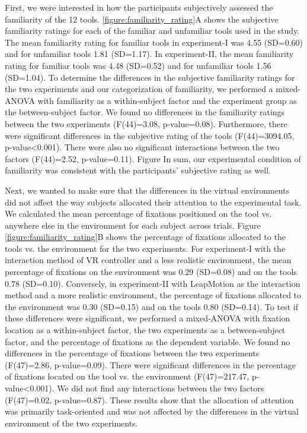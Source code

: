 First, we were interested in how the participants subjectively assessed the familiarity of the 12 tools. \ref{figure:familiarity_rating}A shows the subjective familiarity ratings for each of the familiar and unfamiliar tools used in the study. The mean familiarity rating for familiar tools in experiment-I was 4.55 (SD=0.60) and for unfamiliar tools 1.81 (SD=1.17). In experiment-II, the mean familiarity rating for familiar tools was 4.48 (SD=0.52) and for unfamiliar tools 1.56 (SD=1.04). To determine the differences in the subjective familiarity ratings for the two experiments and our categorization of familiarity, we performed a mixed-ANOVA with familiarity as a within-subject factor and the experiment group as the between-subject factor. We found no differences in the familiarity ratings between the two experiments (F(44)=3.08, p-value=0.08). Furthermore, there were significant differences in the subjective rating of the tools (F(44)=3094.05, p-value<0.001). There were also no significant interactions between the two factors (F(44)=2.52, p-value=0.11). Figure  In sum, our experimental condition of familiarity was consistent with the participants’ subjective rating as well. 

Next, we wanted to make sure that the differences in the virtual environments did not affect the way subjects allocated their attention to the experimental task. We calculated the mean percentage of fixations positioned on the tool vs. anywhere else in the environment for each subject across trials. Figure \ref{figure:familiarity_rating}B shows the percentage of fixations allocated to the tools vs. the environment for the two experiments. For experiment-I with the interaction method of VR controller and a less realistic environment, the mean percentage of fixations on the environment was 0.29 (SD=0.08) and on the tools 0.78 (SD=0.10). Conversely, in experiment-II with LeapMotion as the interaction method and a more realistic environment, the percentage of fixations allocated to the environment was 0.30 (SD=0.15) and on the tools 0.80 (SD=0.14). To test if these differences were significant, we performed a mixed-ANOVA with fixation location as a within-subject factor, the two experiments as a between-subject factor, and the percentage of fixations as the dependent variable.  We found no differences in the percentage of fixations between the two experiments (F(47)=2.86, p-value=0.09). There were significant differences in the percentage of fixations located on the tool vs. the environment (F(47)=217.47, p-value<0.001). We did not find any interactions between the two factors (F(47)=0.02, p-value=0.87). These results show that the allocation of attention was primarily task-oriented and was not affected by the differences in the virtual environment of the two experiments.

